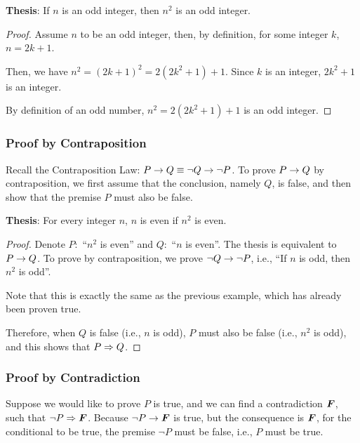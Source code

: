 \begin{example} \quad\par
    \textbf{Thesis}: If $n$ is an odd integer, then $n^2$ is an odd integer.

    \begin{proof}
        Assume $n$ to be an odd integer, then, by definition, for some integer $k$,
        $n=2k+1$.

        Then, we have $n^2 = (2k+1)^2 = 2(2k^2 + 1) + 1$.
        Since $k$ is an integer, $2k^2 + 1$ is an integer.

        By definition of an odd number, $n^2=2(2k^2 + 1) + 1$ is an odd integer.
    \end{proof}
\end{example}

\subsubsection{Proof by Contraposition}

Recall the Contraposition Law: $P \rightarrow Q \equiv \neg Q \rightarrow \neg P$. To prove $P \rightarrow Q$
by contraposition, we first assume that the conclusion, namely $Q$, is false, and then
show that the premise $P$ must also be false.

\begin{example} \quad\par
    \textbf{Thesis}: For every integer $n$, $n$ is even if $n^2$ is even.

    \begin{proof}
        Denote $P:$ ``$n^2$ is even'' and $Q:$ ``$n$ is even''. The thesis is equivalent
        to $P \rightarrow Q$. To prove by contraposition, we prove $\neg Q \rightarrow \neg P$, i.e.,
        ``If $n$ is odd, then $n^2$ is odd''.

        Note that this is exactly the same as the previous example, which has already
        been proven true.

        Therefore, when $Q$ is false (i.e., $n$ is odd), $P$ must also be false (i.e.,
        $n^2$ is odd), and this shows that $P \Rightarrow Q$.
    \end{proof}
\end{example}

\subsubsection{Proof by Contradiction}

Suppose we would like to prove $P$ is true, and we can find a contradiction $\bm{F}$,
such that $\neg P \Rightarrow \bm{F}$. Because $\neg P \rightarrow \bm{F}$ is true, but the
consequence is $\bm{F}$, for the conditional to be true, the premise $\neg P$ must
be false, i.e., $P$ must be true.

